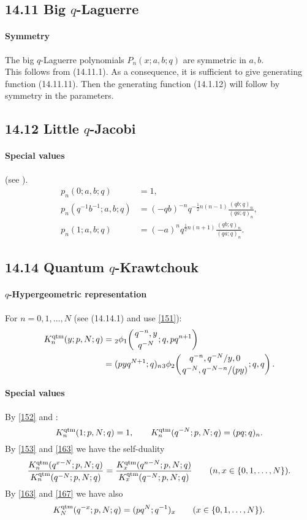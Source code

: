 \documentclass[twoside,11pt]{article}
\newcommand\sa{\smallskipamount}
\newcommand\sLP{\\[\sa]}
\newcommand\half{\frac12}
\newcommand{\qhypK}[5]{ \mbox{}_{#1}\phi_{#2}\!\left(
  \genfrac{}{}{0pt}{}{#3}{#4};#5\right)}
\begin{document}
\subsection*{14.11 Big $q$-Laguerre}
\label{sec14.11}
%
\paragraph{Symmetry}
The big $q$-Laguerre polynomials $P_n(x;a,b;q)$ are symmetric in $a,b$.
\sLP
This follows from (14.11.1).
As a consequence, it is sufficient to give generating function (14.11.11). Then the generating
function (14.1.12) will follow by symmetry in the parameters.
%
\subsection*{14.12 Little $q$-Jacobi}
\label{sec14.12}
\paragraph{Special values}
(see \cite[\S2.4]{K17}).
\begin{align}
p_n(0;a,b;q)&=1,\label{127}\\
p_n(q^{-1}b^{-1};a,b;q)&=(-qb)^{-n} q^{-\half n(n-1)} \frac{(qb;q)_n}{(qa;q)_n} ,\label{128}\\
p_n(1;a,b;q)&=(-a)^n q^{\half n(n+1)} \frac{(qb;q)_n}{(qa;q)_n} .\label{129}
\end{align}
%
\subsection*{14.14 Quantum $q$-Krawtchouk}
\label{sec14.14}
%
\paragraph{$q$-Hypergeometric representation}
For $n=0,1,\ldots,N$
(see (14.14.1) and use \eqref{151}):
\begin{align}
K_n^{\rm qtm}(y;p,N;q)
&=\qhypK21{q^{-n},y}{q^{-N}}{q,pq^{n+1}}
\label{152}\\
&=(pyq^{N+1};q)_n 
\qhypK32{q^{-n},q^{-N}/y,0}{q^{-N},q^{-N-n}/(py)}{q,q}.
\label{153}
\end{align}
%
\paragraph{Special values}
By \eqref{152} and :
\begin{equation}
K_n^{\rm qtm}(1;p,N;q)=1,\qquad
K_n^{\rm qtm}(q^{-N};p,N;q)=(pq;q)_n.
\label{163}
\end{equation}
By \eqref{153} and \eqref{163} we have the self-duality
\begin{equation}
\frac{K_n^{\rm qtm}(q^{x-N};p,N;q)}{K_n^{\rm qtm}(q^{-N};p,N;q)}
=\frac{K_x^{\rm qtm}(q^{n-N};p,N;q)}{K_x^{\rm qtm}(q^{-N};p,N;q)}\qquad
(n,x\in\{0,1,\ldots,N\}).
\label{167}
\end{equation}
By \eqref{163} and \eqref{167} we have also
\begin{equation}
K_N^{\rm qtm}(q^{-x};p,N;q)=(pq^N;q^{-1})_x\qquad(x\in\{0,1,\ldots,N\}).
\label{169}
\end{equation}
%
\end{document}
